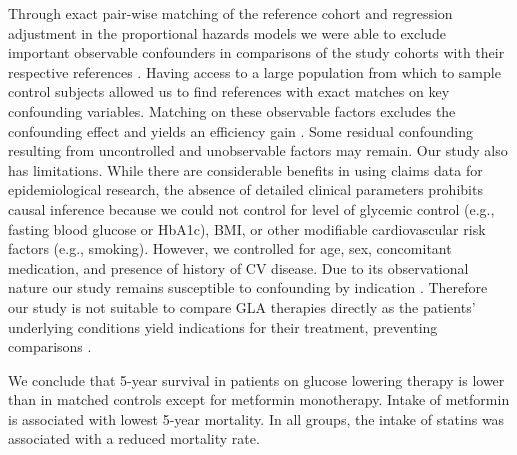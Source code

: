Through exact pair-wise matching of the reference cohort and regression adjustment in the proportional hazards models we were able to exclude important observable confounders in comparisons of the study cohorts with their respective references \citep{s27}. Having access to a large population from which to sample control subjects allowed us to find references with exact matches on key confounding variables. Matching on these observable factors excludes the confounding effect and yields an efficiency gain \citep{s28}. Some residual confounding resulting from uncontrolled and unobservable factors may remain.
Our study also has limitations. While there are considerable benefits in using claims data for epidemiological research, the absence of detailed clinical parameters prohibits causal inference because we could not control for level of glycemic control (e.g., fasting blood glucose or HbA1c), BMI, or other modifiable cardiovascular risk factors (e.g., smoking). However, we controlled for age, sex, concomitant medication, and presence of history of CV disease. Due to its observational nature our study remains susceptible to confounding by indication \citep{s29,s30,s31}. Therefore our study is not suitable to compare GLA therapies directly as the patients' underlying conditions yield indications for their treatment, preventing comparisons \citep{s29,s32}. 

We conclude that 5-year survival in patients on glucose lowering therapy is lower than in matched controls except for metformin monotherapy. Intake of metformin is associated with lowest 5-year mortality. In all groups, the intake of statins was associated with a reduced mortality rate.



